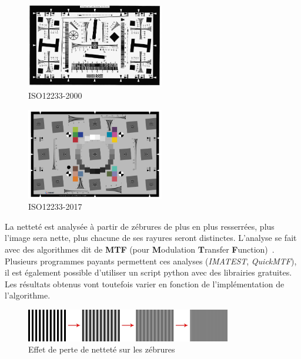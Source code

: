   \begin{minipage}{0.45\textwidth}
  \begin{figure}[H]
      \centering
      \includegraphics[width=6cm]{img/ISO12233-2000.jpg}
      \caption{ISO12233-2000}
  \end{figure}
  \end{minipage}
  \begin{minipage}{0.5\textwidth}
  \begin{figure}[H]
      \centering
      \includegraphics[width=6cm]{img/ISO12233-2017.png}
      \caption{ISO12233-2017}
  \end{figure}
  \end{minipage}

    La netteté est analysée à partir de zébrures de plus en plus resserrées, plus l'image sera nette, plus chacune de ses rayures seront distinctes. L'analyse se fait avec des algorithmes dit de \textbf{MTF} (pour \textbf{M}odulation \textbf{T}ransfer \textbf{F}unction)~\cite{MTF}. Plusieurs programmes payants permettent ces analyses (\textit{IMATEST}, \textit{QuickMTF}), il est également possible d'utiliser un script python avec des librairies gratuites. Les résultats obtenus vont toutefois varier en fonction de l'implémentation de l'algorithme.

    \begin{figure}[H]
      \centering
      \includegraphics[width=0.8\textwidth]{img/mtf.png}
      \caption{Effet de perte de netteté sur les zébrures}
  \end{figure}


